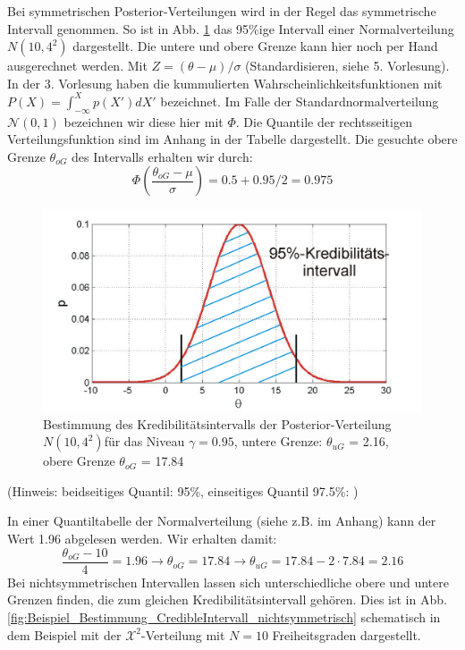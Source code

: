 Bei symmetrischen Posterior-Verteilungen wird in der Regel 
das symmetrische Intervall genommen. So ist in Abb. \ref{fig:Beispiel_Bestimmung_CredibleIntervall}  das 95\%ige Intervall 
einer Normalverteilung $N(10,4^2)$ dargestellt. 
Die untere und obere Grenze kann hier noch per Hand ausgerechnet werden. 
Mit $Z=(\theta - \mu)/ \sigma$ (Standardisieren, siehe 5. Vorlesung).
In der 3. Vorlesung haben die kummulierten Wahrscheinlichkeitsfunktionen mit $P(X) = \int_{-\infty}^{X} p(X') dX'$ bezeichnet. Im Falle der 
Standardnormalverteilung $\mathcal{N}(0,1)$ bezeichnen wir diese hier mit $\Phi$. Die Quantile der rechtsseitigen Verteilungsfunktion sind im Anhang in der Tabelle dargestellt. Die gesuchte obere Grenze $\theta_{oG}$ des Intervalls erhalten wir durch:
\[
\Phi\left(\frac{\theta_{oG}-\mu}{\sigma}\right) = 0.5 + 0.95/2 = 0.975   
\]
\begin{figure}[!htb]
	\begin{center}
		\includegraphics[width=120mm]
		{08_vorlesung/media/Posterior_Vertrauensintervall_all.png}
		\caption{Bestimmung des Kredibilitätsintervalls der Posterior-Verteilung $N(10,4^2)$für das Niveau
			$\gamma = 0.95 $, untere Grenze: $\theta_{uG}$ = 2.16, 
	    	obere Grenze $\theta_{oG}$ = 17.84}
    	\label{fig:Beispiel_Bestimmung_CredibleIntervall} 
	\end{center}
\end{figure}
(Hinweis: beidseitiges Quantil: 95\%, einseitiges Quantil 97.5\%: )

In einer Quantiltabelle der Normalverteilung (siehe z.B. im Anhang) kann der Wert 1.96 abgelesen werden.
Wir erhalten damit: 
\[
\frac{\theta_{oG}-10}{4} = 1.96 \rightarrow \theta_{oG} = 17.84 
\rightarrow \theta_{uG} = 17.84 - 2 \cdot 7.84 = 2.16
\]
Bei nichtsymmetrischen Intervallen lassen sich unterschiedliche obere und untere Grenzen finden, die zum gleichen Kredibilitätsintervall gehören. Dies ist in 
Abb. \ref{fig:Beispiel_Bestimmung_CredibleIntervall_nichtsymmetrisch}
schematisch in dem Beispiel mit der $\mathcal{X}^2$-Verteilung mit $N=10$ Freiheitsgraden dargestellt.

